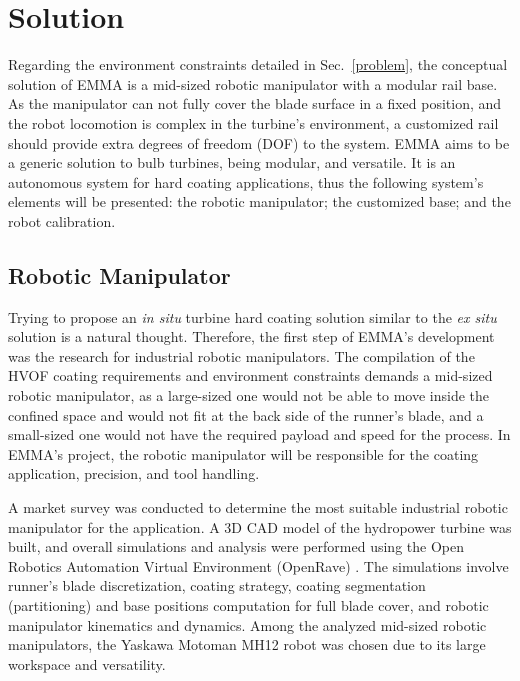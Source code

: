 \section{Solution}\label{solution}


Regarding the environment constraints detailed in Sec.~\ref{problem}, the
conceptual solution of EMMA is a mid-sized robotic manipulator with a modular
rail base. As the manipulator can not fully cover the blade surface in a
fixed position, and the robot locomotion is complex in the turbine's
environment, a customized rail should provide extra degrees of freedom (DOF) to
the system. EMMA aims to be a generic solution to bulb turbines, being modular,
and versatile. It is an autonomous system for hard coating applications, thus
the following system's elements will be presented: the robotic manipulator; the
customized base; and the robot calibration.


\subsection{Robotic Manipulator}\label{manipulator}
Trying to propose an \textit{in situ} turbine hard coating solution similar to
the \textit{ex situ} solution is a natural thought. Therefore, the first step of
EMMA's development was the research for industrial robotic manipulators. The
compilation of the HVOF coating requirements and environment constraints demands
a mid-sized robotic manipulator, as a large-sized one would not be able to move
inside the confined space and would not fit at the back side of the
runner's blade, and a small-sized one would not have the required payload and
speed for the process. In EMMA's project, the robotic manipulator will be
responsible for the coating application, precision, and tool handling.

A market survey was conducted to determine the most suitable industrial robotic
manipulator for the application. A 3D CAD model of the hydropower turbine was
built, and overall simu\-lations and analysis were performed using the Open
Robotics Automation Virtual Environment (OpenRave) \cite{diankov2008openrave}.
The simulations involve runner's blade discretization, coating strategy,
coating segmentation (partitioning) and base positions computation for full
blade cover, and robotic manipulator kinematics and dynamics. Among the
analyzed mid-sized robotic manipulators, the Yaskawa Motoman MH12\raisebox{1ex}{\textregistered}
robot was chosen due to its large%
 workspace and versatility.


